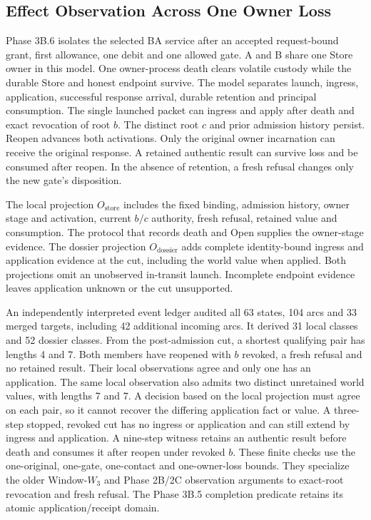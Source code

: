 \documentclass[11pt,a4paper]{article}
\theoremstyle{definition}
\theoremstyle{remark}
\begin{document}
\subsection{Effect Observation Across One Owner Loss}

Phase 3B.6 isolates the selected BA service after an accepted request-bound grant, first allowance, one debit and one allowed gate. A and B share one Store owner in this model. One owner-process death clears volatile custody while the durable Store and honest endpoint survive. The model separates launch, ingress, application, successful response arrival, durable retention and principal consumption. The single launched packet can ingress and apply after death and exact revocation of root $b$. The distinct root $c$ and prior admission history persist. Reopen advances both activations. Only the original owner incarnation can receive the original response. A retained authentic result can survive loss and be consumed after reopen. In the absence of retention, a fresh refusal changes only the new gate's disposition.

The local projection $O_{\mathrm{store}}$ includes the fixed binding, admission history, owner stage and activation, current $b/c$ authority, fresh refusal, retained value and consumption. The protocol that records death and Open supplies the owner-stage evidence. The dossier projection $O_{\mathrm{dossier}}$ adds complete identity-bound ingress and application evidence at the cut, including the world value when applied. Both projections omit an unobserved in-transit launch. Incomplete endpoint evidence leaves application unknown or the cut unsupported.

An independently interpreted event ledger audited all 63 states, 104 arcs and 33 merged targets, including 42 additional incoming arcs. It derived 31 local classes and 52 dossier classes. From the post-admission cut, a shortest qualifying pair has lengths 4 and 7. Both members have reopened with $b$ revoked, a fresh refusal and no retained result. Their local observations agree and only one has an application. The same local observation also admits two distinct unretained world values, with lengths 7 and 7. A decision based on the local projection must agree on each pair, so it cannot recover the differing application fact or value. A three-step stopped, revoked cut has no ingress or application and can still extend by ingress and application. A nine-step witness retains an authentic result before death and consumes it after reopen under revoked $b$. These finite checks use the one-original, one-gate, one-contact and one-owner-loss bounds. They specialize the older Window-$W_3$ and Phase 2B/2C observation arguments to exact-root revocation and fresh refusal. The Phase 3B.5 completion predicate retains its atomic application/receipt domain.
\end{document}
